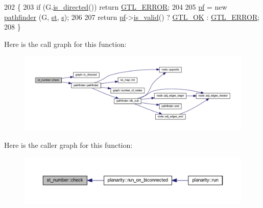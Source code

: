 \begin{DoxyCode}
202 \{
203     \textcolor{keywordflow}{if} (G.\mbox{\hyperlink{classgraph_afc510be7479fa903fde9e0e615470ab0}{is\_directed}}()) \textcolor{keywordflow}{return} \mbox{\hyperlink{classalgorithm_af1a0078e153aa99c24f9bdf0d97f6710a6fcf574690bbd6cf710837a169510dd7}{GTL\_ERROR}};
204     
205     \mbox{\hyperlink{classst__number_a2aa9c83b684379d86c4e620f0a3e5703}{pf}} = \textcolor{keyword}{new} \mbox{\hyperlink{classpathfinder}{pathfinder}} (G, \mbox{\hyperlink{classst__number_a58fe3a128f0d06ce17742b62d8eff1a8}{st}}, \mbox{\hyperlink{classst__number_a1ada73c04f88b70b2392aa9ab0d1a6b0}{s}});
206     
207     \textcolor{keywordflow}{return} \mbox{\hyperlink{classst__number_a2aa9c83b684379d86c4e620f0a3e5703}{pf}}->\mbox{\hyperlink{classpathfinder_a3e595928f8f00bb7b9639f82684f8f05}{is\_valid}}() ? \mbox{\hyperlink{classalgorithm_af1a0078e153aa99c24f9bdf0d97f6710a5114c20e4a96a76b5de9f28bf15e282b}{GTL\_OK}} : \mbox{\hyperlink{classalgorithm_af1a0078e153aa99c24f9bdf0d97f6710a6fcf574690bbd6cf710837a169510dd7}{GTL\_ERROR}};
208 \}
\end{DoxyCode}
Here is the call graph for this function\+:\nopagebreak
\begin{figure}[H]
\begin{center}
\leavevmode
\includegraphics[width=350pt]{classst__number_a2aad4550b821c52d6998bff35fd8648f_cgraph}
\end{center}
\end{figure}
Here is the caller graph for this function\+:\nopagebreak
\begin{figure}[H]
\begin{center}
\leavevmode
\includegraphics[width=350pt]{classst__number_a2aad4550b821c52d6998bff35fd8648f_icgraph}
\end{center}
\end{figure}
\mbox{\label{classst__number_a3912b83a8cbddcb1fc804d20be528d52}} 
